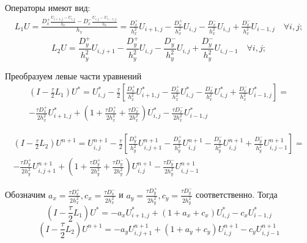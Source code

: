 \documentclass[a4paper,12pt]{article}
\begin{document}
Операторы имеют вид:
\begin{multline*}
  L_1 U = \frac{D^+_x \frac{U_{i+1,j} - U_{i,j}}{h_x} - D^-_x\frac{U_{i,j} - U_{i-1,j}}{h_x}}{h_x}
  = \frac{D^+_x}{h_x^2} U_{i+1,j} - \frac{D^+_x}{h_x^2}U_{i,j} - \frac{D^-_x}{h_x^2} U_{i,j} + \frac{D^-_x}{h_x^2}U_{i-1,j} \quad \forall i,j;
\end{multline*}
\begin{equation*}
  L_2 U = \frac{D^+_y}{h_y^2} U_{i,j+1} - \frac{D^+_y}{h_y^2}U_{i,j} - \frac{D^-_y}{h_y^2} U_{i,j} + \frac{D^-_y}{h_y^2}U_{i,j-1} \quad \forall i,j;
\end{equation*}

Преобразуем левые части уравнений
\begin{multline*}
  \left( I - \frac{\tau}{2} L_1 \right) U^* = U^*_{i,j} - \frac{\tau}{2} \left[\frac{D^+_x}{h_x^2} U^*_{i+1,j} - \frac{D^+_x}{h_x^2}U^*_{i,j} - \frac{D^-_x}{h_x^2} U^*_{i,j} + \frac{D^-_x}{h_x^2}U^*_{i-1,j} \right] = \\
  - \frac{\tau D^+_x }{2 h_x^2} U^*_{i+1,j} + \left(1 + \frac{\tau D^+_x}{2h_x^2} + \frac{\tau D^-_x}{2 h_x^2} \right) U^*_{i,j} - \frac{\tau D^-_x}{2h_x^2} U^*_{i-1,j}
\end{multline*}

\begin{multline*}
  \left( I - \frac{\tau}{2} L_2 \right) U^{n+1} = U^{n+1}_{i,j} - \frac{\tau}{2} \left[ \frac{D^+_y}{h_y^2} U^{n+1}_{i,j+1} - \frac{D^+_y}{h_y^2}U^{n+1}_{i,j} - \frac{D^-_y}{h_y^2} U^{n+1}_{i,j} + \frac{D^-_y}{h_y^2}U^{n+1}_{i,j-1}  \right] = \\
  - \frac{\tau D^+_y }{2 h_y^2} U^{n+1}_{i,j+1} + \left(1 + \frac{\tau D^+_y}{2h_y^2} + \frac{\tau D^-_y}{2 h_y^2} \right) U^{n+1}_{i,j} - \frac{\tau D^-_y}{2h_y^2} U^{n+1}_{i,j-1}
\end{multline*}

Обозначим  $a_x = \frac{\tau D^+_x}{2h_x^2}, c_x = \frac{\tau D^-_x}{2h_x^2}$ и  $a_y = \frac{\tau D^+_y}{2h_y^2}, c_y = \frac{\tau D^-_y}{2h_y^2}$ соответственно. Тогда
\begin{equation*}
  \left( I - \frac{\tau}{2} L_1 \right) U^* = - a_x U^*_{i+1,j} + \left(1 + a_x + c_x \right) U^*_{i,j} - c_x U^*_{i-1,j}
\end{equation*}
\begin{equation*}
  \left( I - \frac{\tau}{2} L_2 \right) U^{n+1} = - a_y U^{n+1}_{i,j+1} + \left(1 + a_y + c_y \right) U^{n+1}_{i,j} - c_y U^{n+1}_{i,j-1}
\end{equation*}
\end{document}
